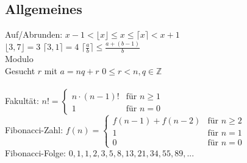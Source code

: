\documentclass[fs, footer]{latex4ei}
\begin{document}
\begin{multicols*}{4}
\section{Allgemeines}
Auf/Abrunden: $x-1 < \lfloor x \rfloor \le x \le \lceil x \rceil < x+1$\\
$\lfloor 3,7 \rfloor = 3$ \qquad $\lceil 3,1 \rceil = 4$ \qquad $\lceil \frac{a}{b} \rceil \le \frac{a+(b-1)}{b}$\\[0.5em]
Modulo \\
Gesucht $r$ mit $a = nq +r$ \qquad $0 \le r < n, q \in \mathbb Z$\\
\\
Fakultät: $n! = \begin{cases} n \cdot (n-1)! & \text{für } n \ge 1 \\ 1  & \text{für } n = 0 \end{cases}$\\
Fibonacci-Zahl: $f(n) = \begin{cases} f(n-1) + f(n-2) & \text{für } n\ge 2\\ 1 & \text{für } n = 1 \\ 0 & \text{für } n = 0 \end{cases}$\\
Fibonacci-Folge: $0,1,1,2,3,5,8,13,21,34,55,89,...$\\

\end{multicols*}
\end{document}
